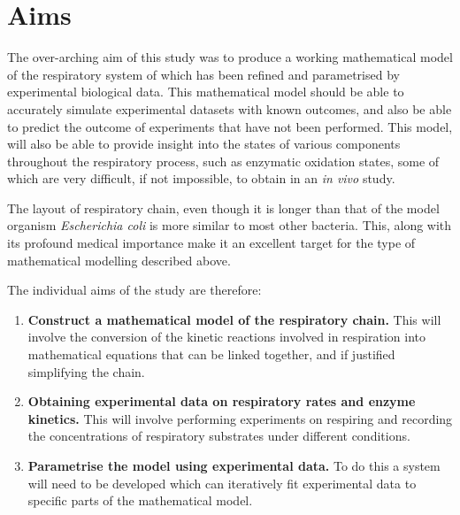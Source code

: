\section{Aims}
The over-arching aim of this study was to produce a working mathematical model of the respiratory system of \Nm{} which has been refined and parametrised by experimental biological data. This mathematical model should be able to accurately simulate experimental datasets with known outcomes, and also be able to predict the outcome of experiments that have not been performed. This model, will also be able to provide insight into the states of various components throughout the respiratory process, such as enzymatic oxidation states, some of which are very difficult, if not impossible, to obtain in an \textit{in vivo} study.

The layout of \Nm{} respiratory chain, even though it is longer than that of the model organism \textit{Escherichia coli} is more similar to most other bacteria. This, along with its profound medical importance make it an excellent target for the type of mathematical modelling described above.

The individual aims of the study are therefore:
\begin{enumerate}
\item {\bf Construct a mathematical model of the \Nm{} respiratory chain.} This will involve the conversion of the kinetic reactions involved in respiration into mathematical equations that can be linked together, and if justified simplifying the chain.
\item {\bf Obtaining experimental data on respiratory rates and enzyme kinetics.} This will involve performing experiments on respiring \Nm{} and recording the concentrations of respiratory substrates under different conditions.
\item {\bf Parametrise the model using experimental data.} To do this a system will need to be developed which can iteratively fit experimental data to specific parts of the mathematical model.
\end{enumerate}